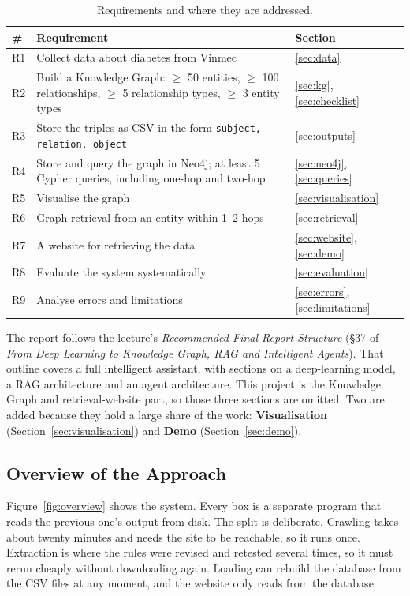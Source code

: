 \documentclass[11pt, a4paper]{article}
\newcommand{\code}[1]{\texttt{#1}}
\begin{document}
\begin{table}[H]
\centering
\small
\caption{Requirements and where they are addressed.}
\label{tab:requirements}
\begin{tabularx}{\textwidth}{l X l}
\toprule
\# & Requirement & Section \\
\midrule
R1 & Collect data about diabetes from Vinmec & \ref{sec:data} \\
R2 & Build a Knowledge Graph: $\geq$ 50 entities, $\geq$ 100 relationships, $\geq$ 5 relationship types, $\geq$ 3 entity types & \ref{sec:kg}, \ref{sec:checklist} \\
R3 & Store the triples as CSV in the form \code{subject, relation, object} & \ref{sec:outputs} \\
R4 & Store and query the graph in Neo4j; at least 5 Cypher queries, including one-hop and two-hop & \ref{sec:neo4j}, \ref{sec:queries} \\
R5 & Visualise the graph & \ref{sec:visualisation} \\
R6 & Graph retrieval from an entity within 1--2 hops & \ref{sec:retrieval} \\
R7 & A website for retrieving the data & \ref{sec:website}, \ref{sec:demo} \\
R8 & Evaluate the system systematically & \ref{sec:evaluation} \\
R9 & Analyse errors and limitations & \ref{sec:errors}, \ref{sec:limitations} \\
\bottomrule
\end{tabularx}
\end{table}

The report follows the lecture's \emph{Recommended Final Report Structure} (§37 of \emph{From Deep Learning to Knowledge Graph, RAG and Intelligent Agents}). That outline covers a full intelligent assistant, with sections on a deep-learning model, a RAG architecture and an agent architecture. This project is the Knowledge Graph and retrieval-website part, so those three sections are omitted. Two are added because they hold a large share of the work: \textbf{Visualisation} (Section~\ref{sec:visualisation}) and \textbf{Demo} (Section~\ref{sec:demo}).

\subsection{Overview of the Approach}

Figure~\ref{fig:overview} shows the system. Every box is a separate program that reads the previous one's output from disk. The split is deliberate. Crawling takes about twenty minutes and needs the site to be reachable, so it runs once. Extraction is where the rules were revised and retested several times, so it must rerun cheaply without downloading again. Loading can rebuild the database from the CSV files at any moment, and the website only reads from the database.
\end{document}
